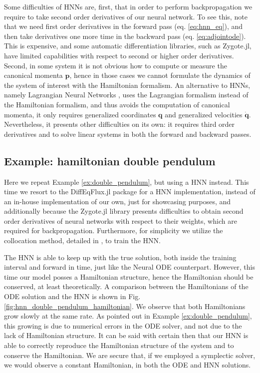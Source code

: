 \documentclass[final,onefignum,onetabnum]{siamart220329}
\newcommand{\bol}{\boldsymbol}
\begin{document}
Some difficulties of HNNs are, first, that in order to perform backpropagation we require to take second order derivatives of our neural network. To see this, note that we need first order derivatives in the forward pass (eq. \ref{eq:hnn_eq}), and then take derivatives one more time in the backward pass (eq. \ref{eq:adjointode}). This is expensive, and some automatic differentiation libraries, such as Zygote.jl, have limited capabilities with respect to second or higher order derivatives. Second, in some system it is not obvious how to compute or measure the canonical momenta $\bol p$, hence in those cases we cannot formulate the dynamics of the system of interest with the Hamiltonian formalism. An alternative to HNNs, namely Lagrangian Neural Networks \cite{cranmer2020lagrangian}, uses the Lagrangian formalism instead of the Hamiltonian formalism, and thus avoids the computation of canonical momenta, it only requires generalized coordinates $\bol q$ and generalized velocities $\dot{\bol{q}}$. Nevertheless, it presents other difficulties on its own: it requires third order derivatives and to solve linear systems in both the forward and backward passes.

\subsection{Example: hamiltonian double pendulum}\label{ex:hnn_double_pendulum}
Here we repeat Example \ref{ex:double_pendulum}, but using a HNN instead. This time we resort to the DiffEqFlux.jl package for a HNN implementation, instead of an in-house implementation of our own, just for showcasing purposes, and additionally because the Zygote.jl library presents difficulties to obtain second order derivatives of neural networks with respect to their weights, which are required for backpropagation. Furthermore, for simplicity we utilize the collocation method, detailed in \cite{roesch2021collocation}, to train the HNN.

The HNN is able to keep up with the true solution, both inside the training interval and forward in time, just like the Neural ODE counterpart. However, this time our model posses a Hamiltonian structure, hence the Hamiltonian should be conserved, at least theoretically. A comparison between the Hamiltonians of the ODE solution and the HNN is shown in Fig. \ref{fig:hnn_double_pendulum_hamiltonian}. We observe that both Hamiltonians grow slowly at the same rate. As pointed out in Example \ref{ex:double_pendulum}, this growing is due to numerical errors in the ODE solver, and not due to the lack of Hamiltonian structure. It can be said with certain then that our HNN is able to correctly reproduce the Hamiltonian structure of the system and to conserve the Hamiltonian. We are secure that, if we employed a symplectic solver, we would observe a constant Hamiltonian, in both the ODE and HNN solutions.
\end{document}
